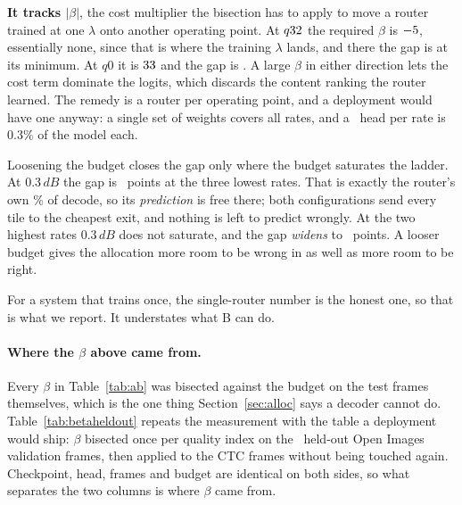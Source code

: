 \documentclass[10pt,twocolumn,letterpaper]{article}
\newcommand{\dB}{\,dB}
\begin{document}
\textbf{It tracks $|\beta|$}, the cost multiplier the bisection has to apply to
move a router trained at one $\lambda$ onto another operating point. At
$q32$ the required $\beta$ is $-5$, essentially none, since
that is where the training $\lambda$ lands, and there the gap is at its minimum.
At $q0$ it is $33$ and the gap is \GapMax. A large $\beta$ in either
direction lets the cost term dominate the logits, which discards the content
ranking the router learned. The remedy is a router per operating point, and a
deployment would have one anyway: a single set of weights covers all rates, and
a \RouterParams\ head per rate is $0.3\%$ of the model each.

Loosening the budget closes the gap only where the budget saturates the ladder.
At $0.3\dB$ the gap is \GapLooseLow\ points at the three lowest rates. That is
exactly the router's own \RouterCostPct\% of decode, so its \emph{prediction} is
free there; both configurations send every tile to the cheapest exit, and
nothing is left to predict wrongly. At the two highest rates $0.3\dB$ does not
saturate, and the gap \emph{widens} to \GapLooseHigh\ points. A looser budget
gives the allocation more room to be wrong in as well as more room to be right.

For a system that trains once, the single-router number is the honest one, so
that is what we report. It understates what B can do.

\begin{table}[t]
\centering
\resizebox{\columnwidth}{!}{}
\caption{\textbf{Choosing $\beta$ without the test set.} Left, $\beta$ bisected
on the \HeldNCal\ held-out validation frames and then applied to the test frames
unchanged; right, $\beta$ bisected on the test frames themselves, which is what
Table~\ref{tab:ab} reports. Savings are hook counts on the routed decode with
the router's own compute charged against them. The last column re-bisects on the
test set to the quality the held-out $\beta$ delivered, so the two allocations
are differenced at one distortion rather than across two.}
\label{tab:betaheldout}
\end{table}

\paragraph{Where the $\beta$ above came from.} Every $\beta$ in
Table~\ref{tab:ab} was bisected against the budget on the test frames
themselves, which is the one thing Section~\ref{sec:alloc} says a decoder cannot
do. Table~\ref{tab:betaheldout} repeats the measurement with the table a
deployment would ship: $\beta$ bisected once per quality index on the \HeldNCal\
held-out Open Images validation frames, then applied to the CTC frames without
being touched again. Checkpoint, head, frames and budget are identical on both
sides, so what separates the two columns is where $\beta$ came from.
\end{document}
